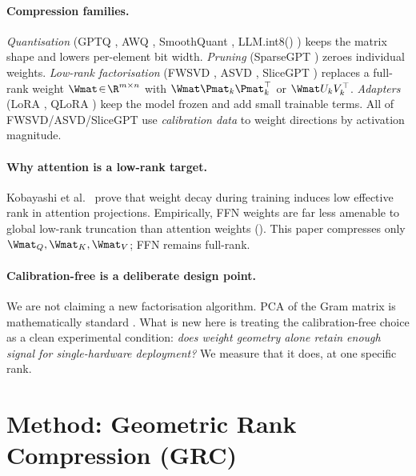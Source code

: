\documentclass[11pt]{article}
\begin{document}
\paragraph{Compression families.}
\textit{Quantisation} (GPTQ \cite{frantar2022gptq}, AWQ \cite{lin2023awq},
SmoothQuant \cite{xiao2022smoothquant}, LLM.int8() \cite{dettmers2022llmint8})
keeps the matrix shape and lowers per-element bit width.  \textit{Pruning}
(SparseGPT \cite{frantar2023sparsegpt}) zeroes individual weights.
\textit{Low-rank factorisation} (FWSVD \cite{hsu2022fwsvd}, ASVD
\cite{yuan2023asvd}, SliceGPT \cite{ashkboos2024slicegpt}) replaces a
full-rank weight $\Wmat\!\in\!\R^{m\times n}$ with $\Wmat\Pmat_k\Pmat_k^\top$
or $\Wmat U_kV_k^\top$.  \textit{Adapters} (LoRA \cite{hu2021lora},
QLoRA \cite{dettmers2023qlora}) keep the model frozen and add small
trainable terms.  All of FWSVD/ASVD/SliceGPT use \emph{calibration data} to
weight directions by activation magnitude.

\paragraph{Why attention is a low-rank target.}
Kobayashi et al.\ \cite{kobayashi2024lowrankattn} prove that weight decay
during training induces low effective rank in attention projections.
Empirically, FFN weights are far less amenable to global low-rank truncation
than attention weights ().  This paper compresses only
$\Wmat_Q,\Wmat_K,\Wmat_V$; FFN remains full-rank.

\paragraph{Calibration-free is a deliberate design point.}
We are not claiming a new factorisation algorithm.  PCA of the Gram matrix is
mathematically standard \cite{trefethen1997nla,golub2013matrix}.  What is new
here is treating the calibration-free choice as a clean experimental
condition: \emph{does weight geometry alone retain enough signal for
single-hardware deployment?}  We measure that it does, at one specific rank.

\section{Method: Geometric Rank Compression (GRC)}
\label{sec:method}
\end{document}
